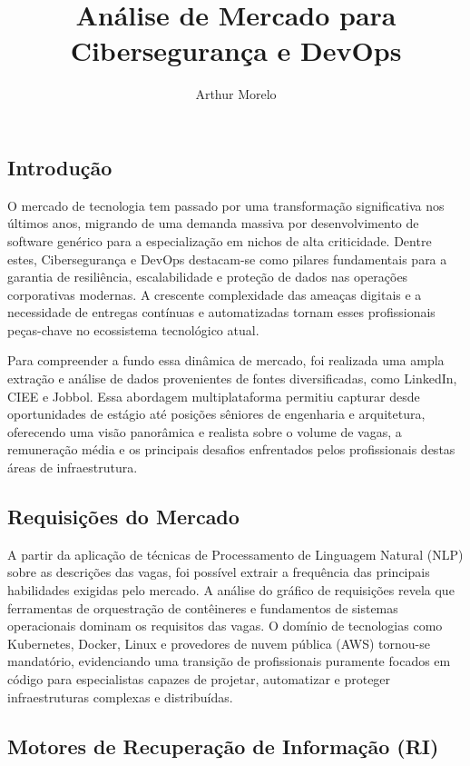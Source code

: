 \documentclass[
  letterpaper,
  DIV=11,
  numbers=noendperiod]{scrartcl}
\title{Análise de Mercado para Cibersegurança e DevOps}
\author{Arthur Morelo}
\date{}
\begin{document}
\maketitle

\subsection{Introdução}\label{introduuxe7uxe3o}

O mercado de tecnologia tem passado por uma transformação significativa
nos últimos anos, migrando de uma demanda massiva por desenvolvimento de
software genérico para a especialização em nichos de alta criticidade.
Dentre estes, Cibersegurança e DevOps destacam-se como pilares
fundamentais para a garantia de resiliência, escalabilidade e proteção
de dados nas operações corporativas modernas. A crescente complexidade
das ameaças digitais e a necessidade de entregas contínuas e
automatizadas tornam esses profissionais peças-chave no ecossistema
tecnológico atual.

Para compreender a fundo essa dinâmica de mercado, foi realizada uma
ampla extração e análise de dados provenientes de fontes diversificadas,
como LinkedIn, CIEE e Jobbol. Essa abordagem multiplataforma permitiu
capturar desde oportunidades de estágio até posições sêniores de
engenharia e arquitetura, oferecendo uma visão panorâmica e realista
sobre o volume de vagas, a remuneração média e os principais desafios
enfrentados pelos profissionais destas áreas de infraestrutura.

\subsection{Requisições do Mercado}\label{requisiuxe7uxf5es-do-mercado}

A partir da aplicação de técnicas de Processamento de Linguagem Natural
(NLP) sobre as descrições das vagas, foi possível extrair a frequência
das principais habilidades exigidas pelo mercado. A análise do gráfico
de requisições revela que ferramentas de orquestração de contêineres e
fundamentos de sistemas operacionais dominam os requisitos das vagas. O
domínio de tecnologias como Kubernetes, Docker, Linux e provedores de
nuvem pública (AWS) tornou-se mandatório, evidenciando uma transição de
profissionais puramente focados em código para especialistas capazes de
projetar, automatizar e proteger infraestruturas complexas e
distribuídas.

\subsection{Motores de Recuperação de Informação
(RI)}\label{motores-de-recuperauxe7uxe3o-de-informauxe7uxe3o-ri}
\end{document}
